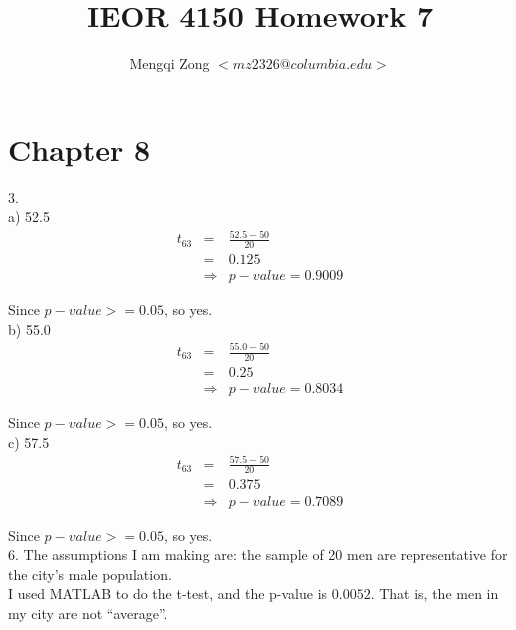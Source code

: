 \documentclass[12pt]{article}
\title{IEOR 4150 Homework 7}
\author{Mengqi Zong $<mz2326@columbia.edu>$}
\begin{document}
\maketitle

\setlength{\parindent}{0in}

\section*{Chapter 8}

3. \\
a) 52.5
\begin{eqnarray*}
  t_{63}
  &=& \frac{52.5 - 50}{20} \\
  &=& 0.125 \\
  &\Rightarrow& p-value = 0.9009 
\end{eqnarray*}

Since $p-value >= 0.05$, so yes. \\

b) 55.0
\begin{eqnarray*}
  t_{63}
  &=& \frac{55.0 - 50}{20} \\
  &=& 0.25 \\
  &\Rightarrow& p-value = 0.8034 
\end{eqnarray*}

Since $p-value >= 0.05$, so yes. \\

c) 57.5
\begin{eqnarray*}
  t_{63}
  &=& \frac{57.5 - 50}{20} \\
  &=& 0.375 \\
  &\Rightarrow& p-value = 0.7089
\end{eqnarray*}

Since $p-value >= 0.05$, so yes. \\

6. The assumptions I am making are: the sample of 20 men are representative for the city's male population. \\

I used MATLAB to do the t-test, and the p-value is $0.0052$. That is, the men in my city are not ``average''. \\
\end{document}
